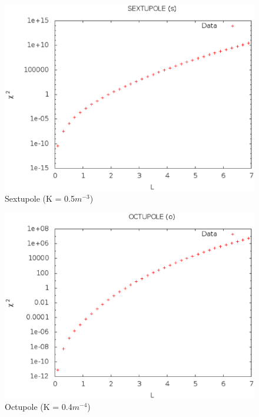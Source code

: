 \documentclass[a4paper]{cernatsnote}
\begin{document}
\begin{figure}
  \centering
  \includegraphics[width=0.8\columnwidth]{imgs/s.eps}
  \caption{Sextupole (K = 0.5$m^{-3}$)}
\end{figure}

\begin{figure}
  \centering
  \includegraphics[width=0.8\columnwidth]{imgs/o.eps}
  \caption{Octupole (K = 0.4$m^{-4}$)}
\end{figure}
\end{document}
